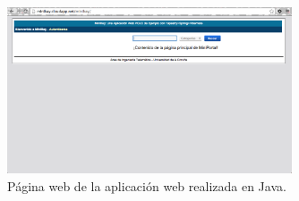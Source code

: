 \documentclass{article}
\begin{document}
\begin{figure}[h]
  \centering
    \includegraphics[width=0.75\textwidth]{img/p027.png}
  \caption{Página web de la aplicación web realizada en Java.}
  \label{fig:minibay}
\end{figure}







\clearpage


{\setlength{\parskip}{0mm} \listoffigures} %

%
%
%
%
\end{document}
